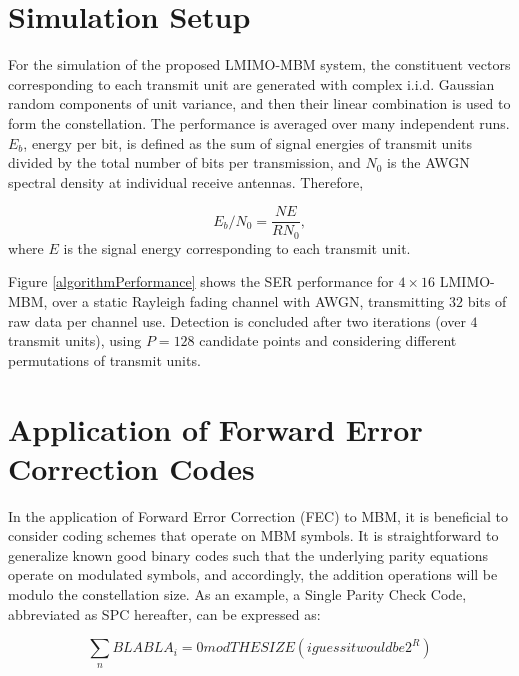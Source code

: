 \section {Simulation Setup}
\label{sec : Simulation Setup}

For the simulation of the proposed LMIMO-MBM system, the constituent vectors corresponding to each transmit unit are generated with complex i.i.d. Gaussian random components of unit variance, and then their linear combination is used to form the constellation. The performance is averaged over many independent runs. $E_b$, energy per bit, is defined as the sum of signal energies of transmit units divided by the total number of bits per transmission, and $N_0$ is the AWGN spectral density at individual receive antennas. Therefore, 

\begin{equation}
\label{ebn0}
E_b/N_0 =\frac{NE}{RN_0},
\end{equation}
where $E$ is the signal energy corresponding to each transmit unit.


Figure \ref{algorithmPerformance} shows the SER performance for $ 4\times 16$ LMIMO-MBM, over a static Rayleigh fading channel with AWGN, transmitting $32$ bits of raw data per channel use. Detection is concluded after two iterations (over $4$ transmit units), using $P = 128$ candidate points and considering different permutations of transmit units.

\section{Application of Forward Error Correction Codes}


In the application of Forward Error Correction (FEC) to MBM, it is beneficial to consider coding schemes that operate on MBM symbols. It is straightforward to generalize known good binary codes such that the underlying parity equations operate on modulated symbols, and accordingly, the addition operations will be modulo the constellation size. As an example, a Single Parity Check Code, abbreviated as SPC hereafter, can be expressed as:


\begin{equation}
\sum_n BLABLA_i=0 mod THE SIZE (i guess it would be 2^R)
\end{equation}


